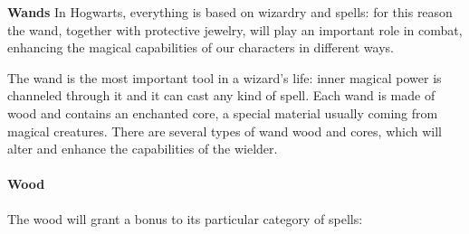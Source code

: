 \textbf{Wands} In Hogwarts, everything is based on wizardry and spells: for this reason the wand, together with protective jewelry, will play an important role in combat, enhancing the magical capabilities of our characters in different ways.

The wand is the most important tool in a wizard's life: inner magical power is channeled through it and it can cast any kind of spell. Each wand is made of wood and contains an enchanted core, a special material usually coming from magical creatures.
There are several types of wand wood and cores, which will alter and enhance the capabilities of the wielder.

\paragraph{Wood} The wood will grant a bonus to its particular category of spells: \\

